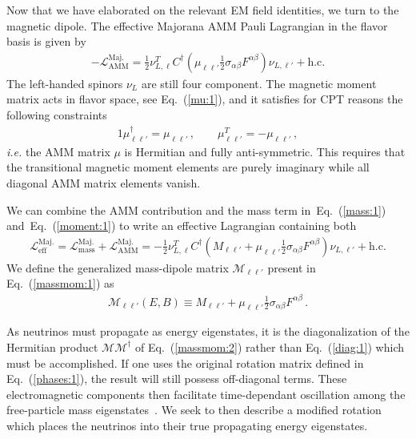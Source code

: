 \documentclass[addchapnum]{ws-rv961x669} %
\newcommand{\req}[1]{Eq.~(\ref{#1})}
\begin{document}
Now that we have elaborated on the relevant EM field identities, we turn to the magnetic dipole. The effective Majorana AMM Pauli Lagrangian in the flavor basis is given by~\cite{Shrock:1980vy}
\begin{align}
	\label{moment:1} -\mathcal{L}_{\mathrm{AMM}}^\mathrm{Maj.}=\frac{1}{2}\nu_{L,\ell}^{T}C^{\dag}\left(\mu_{\ell\ell'}\frac{1}{2}\sigma_{\alpha\beta}F^{\alpha\beta}\right)\nu_{L,\ell'}+\mathrm{h.c.}
\end{align}
The left-handed spinors $\nu_{L}$ are still four component. The magnetic moment matrix acts in flavor space, see \req{mu:1}, and it satisfies for CPT reasons the following constraints~\cite{Giunti:2014ixa}
\begin{alignat}{1}
	\label{props:1}
    \mu_{\ell\ell'}^{\dag}=\mu_{\ell\ell'}\,,\qquad
    \mu_{\ell\ell'}^{T}=-\mu_{\ell\ell'}\,,
\end{alignat}
{\it i.e.\/} the AMM matrix $\mu$ is Hermitian and fully anti-symmetric. This requires that the transitional magnetic moment elements are purely imaginary while all diagonal AMM matrix elements vanish.

We can combine the AMM contribution and the mass term in~\req{mass:1} and~\req{moment:1} to write an effective Lagrangian containing both
\begin{align}
	\label{massmom:1}
    \mathcal{L}_\mathrm{eff}^\mathrm{Maj.} =
    \mathcal{L}_\mathrm{mass}^\mathrm{Maj.} + \mathcal{L}_\mathrm{AMM}^\mathrm{Maj.} = 
    -\frac{1}{2}\nu_{L,\ell}^{T}C^{\dag}\left(M_{\ell\ell'}+\mu_{\ell\ell'}\frac{1}{2}\sigma_{\alpha\beta}F^{\alpha\beta}\right)\nu_{L,\ell'}+\mathrm{h.c.}
\end{align}
We define the generalized mass-dipole matrix $\mathcal{M}_{\ell\ell'}$ present in \req{massmom:1} as
\begin{align}
	\label{massmom:2}
    \mathcal{M}_{\ell\ell'}(E,B)\equiv M_{\ell\ell'}+\mu_{\ell\ell'}\frac{1}{2}\sigma_{\alpha\beta}F^{\alpha\beta}\,.
\end{align}

As neutrinos must propagate as energy eigenstates, it is the diagonalization of the Hermitian product $\mathcal{M}\mathcal{M}^{\dag}$ of \req{massmom:2} rather than \req{diag:1} which must be accomplished. If one uses the original rotation matrix defined in \req{phases:1}, the result will still possess off-diagonal terms. These electromagnetic components then facilitate time-dependant oscillation among the free-particle mass eigenstates~\cite{Giunti:2014ixa}. We seek to then describe a modified rotation which places the neutrinos into their true propagating energy eigenstates.
\end{document}
